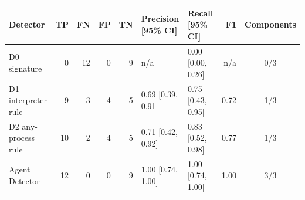 \begin{tabular}{@{}l r r r r l l r c@{}}
\toprule
Detector & TP & FN & FP & TN & Precision [95\% CI] & Recall [95\% CI] & F1 & Components \\
\midrule
D0 signature & 0 & 12 & 0 & 9 & n/a & 0.00 {\scriptsize[0.00, 0.26]} & n/a & 0/3 \\
D1 interpreter rule & 9 & 3 & 4 & 5 & 0.69 {\scriptsize[0.39, 0.91]} & 0.75 {\scriptsize[0.43, 0.95]} & 0.72 & 1/3 \\
D2 any-process rule & 10 & 2 & 4 & 5 & 0.71 {\scriptsize[0.42, 0.92]} & 0.83 {\scriptsize[0.52, 0.98]} & 0.77 & 1/3 \\
Agent Detector & 12 & 0 & 0 & 9 & 1.00 {\scriptsize[0.74, 1.00]} & 1.00 {\scriptsize[0.74, 1.00]} & 1.00 & 3/3 \\
\bottomrule
\end{tabular}
